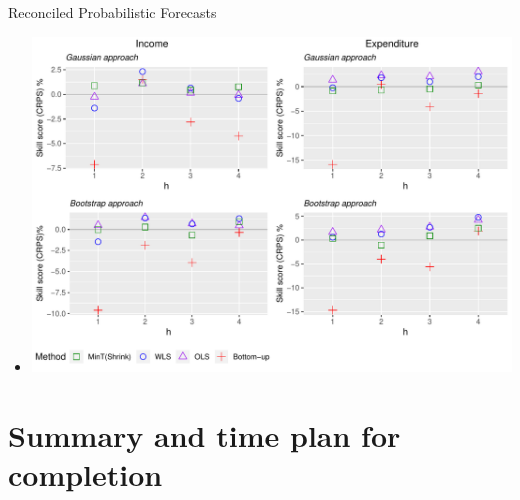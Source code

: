 \documentclass[11pt,xcolor=dvipsnames,table]{beamer} %
\begin{document}
\begin{frame}{Reconciled Probabilistic Forecasts}
\begin{itemize}[<+-| alert@+>]
	\item[] 
	\tiny
	\centering
	\includegraphics[scale=0.55]{Figs/Results/ProbF_UnivS.pdf}
	
	
\end{itemize}
\end{frame}





\section{Summary and time plan for completion}

\end{document}
